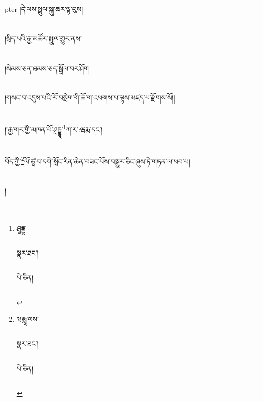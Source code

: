 pter{ }།དེ་ལས་སྤྲུལ་སྐུ་ཆར་ལྟ་བུས།\chapter{ }།སྲིད་པའི་རྒྱ་མཚོར་སྤྲུལ་གྱུར་ནས།\chapter{ }།སེམས་ཅན་ཐམས་ཅད་སྒྲོལ་བར་ཤོག\chapter{ }།གསང་བ་འདུས་པའི་རོ་བསྲེག་གི་ཆོ་ག་འཕགས་པ་ལྷས་མཛད་པ་རྫོགས་སོ།།\chapter{ }།།རྒྱ་གར་གྱི་མཁན་པོ་ཤྲདྡྷཱ་\footnote{ཤྲཱདྡྷ་\chapter{ }\chapter{ }སྣར་ཐང་།\chapter{ }\chapter{ }པེ་ཅིན།\chapter{ }}ཀ་ར་:ཝརྨ་དང་།\chapter{ }བོད་ཀྱི་\footnote{ཝརྨྨཱ་ལས་\chapter{ }\chapter{ }སྣར་ཐང་།\chapter{ }\chapter{ }པེ་ཅིན།\chapter{ }}ལོ་ཙཱ་བ་དགེ་སློང་རིན་ཆེན་བཟང་པོས་བསྒྱུར་ཅིང་ཞུས་ཏེ་གཏན་ལ་ཕབ་པ།\chapter{ }།\chapter{ }